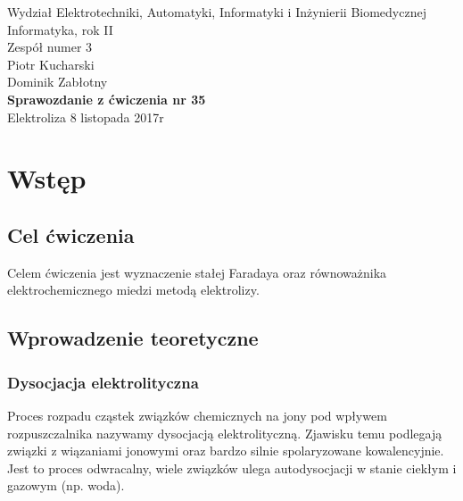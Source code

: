 \documentclass[a4paper,12pts]{article}
\begin{document}
	\thispagestyle{empty}
	\begin{flushleft}
		Wydział Elektrotechniki, Automatyki, Informatyki i Inżynierii Biomedycznej \\
		Informatyka, rok II \\
		Zespół numer 3 \\
		Piotr Kucharski \\
		Dominik Zabłotny \\
		\vspace*{\fill}
		{\large \textbf{Sprawozdanie z ćwiczenia nr 35} } \\
		Elektroliza		
		\vfill	
		8 listopada 2017r
	\end{flushleft}
	
	\newpage
	
	
	\section{Wstęp}
	
		\subsection{Cel ćwiczenia}
		Celem ćwiczenia jest wyznaczenie stałej Faradaya oraz równoważnika elektrochemicznego miedzi metodą elektrolizy.
	
	
		\subsection{Wprowadzenie teoretyczne}
	
			\subsubsection{Dysocjacja elektrolityczna}
			Proces rozpadu cząstek związków chemicznych na jony pod wpływem rozpuszczalnika nazywamy dysocjacją elektrolityczną. Zjawisku temu podlegają związki z wiązaniami jonowymi oraz bardzo silnie spolaryzowane kowalencyjnie. Jest to proces odwracalny, wiele związków ulega autodysocjacji w stanie ciekłym i gazowym (np. woda).
			
\end{document}
